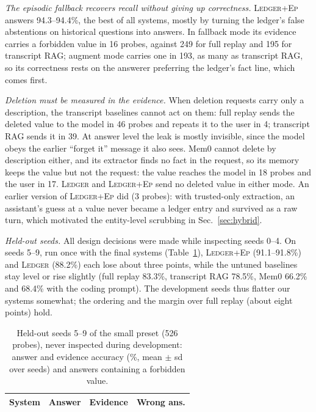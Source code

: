 \documentclass[10pt,conference]{IEEEtran}
\newcommand{\sys}{\textsc{Ledger}}
\newcommand{\hyb}{\textsc{Ledger+Ep}}
\begin{document}
\emph{The episodic fallback recovers recall without giving up correctness.}
\hyb{} answers 94.3--94.4\%, the best of all systems, mostly by turning the
ledger's false abstentions on historical questions into answers. In fallback
mode its evidence carries a forbidden value in 16 probes, against 249 for full
replay and 195 for transcript RAG; augment mode carries one in 193, as many as
transcript RAG, so its correctness rests on the answerer preferring the
ledger's fact line, which comes first.

\emph{Deletion must be measured in the evidence.} When deletion requests carry
only a description, the transcript baselines cannot act on them: full replay sends
the deleted value to the model in 46 probes and repeats it to the user in 4;
transcript RAG sends it in 39. At answer level the leak is mostly invisible, since
the model obeys the earlier ``forget it'' message it also sees. Mem0 cannot
delete by description either, and its extractor finds no fact in the request,
so its memory keeps the value but not the request: the value reaches the model
in 18 probes and the user in 17. \sys{} and \hyb{}
send no deleted value in either mode. An earlier version of \hyb{} did (3 probes):
with trusted-only extraction, an assistant's guess at a value never became a
ledger entry and survived as a raw turn, which motivated the entity-level
scrubbing in Sec.~\ref{sec:hybrid}.

\emph{Held-out seeds.} All design decisions were made while inspecting seeds
0--4. On seeds 5--9, run once with the final systems (Table~\ref{tab:heldout}),
\hyb{} (91.1--91.8\%) and \sys{} (88.2\%) each lose about three points,
while the untuned baselines stay level or rise slightly (full replay 83.3\%,
transcript RAG 78.5\%, Mem0 66.2\% and 68.4\% with the coding prompt). The development seeds thus flatter our systems
somewhat; the ordering and the margin over full replay (about eight points)
hold.

\begin{table}[t]
\caption{Held-out seeds 5--9 of the small preset (526 probes), never inspected
during development: answer and evidence accuracy (\%, mean $\pm$ sd over seeds)
and answers containing a forbidden value.}
\label{tab:heldout}
\centering
\footnotesize
\begin{tabular}{@{}lccr@{}}
\toprule
System & Answer & Evidence & Wrong ans. \\
\midrule

\bottomrule
\end{tabular}
\end{table}
\end{document}
